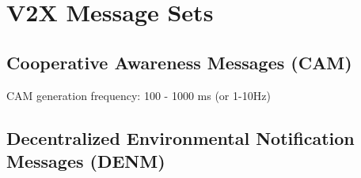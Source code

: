 

\section{V2X Message Sets}



\subsection{Cooperative Awareness Messages (CAM)}



CAM generation frequency: 100 - 1000 ms (or 1-10Hz)

\subsection{Decentralized Environmental Notification Messages (DENM)}


